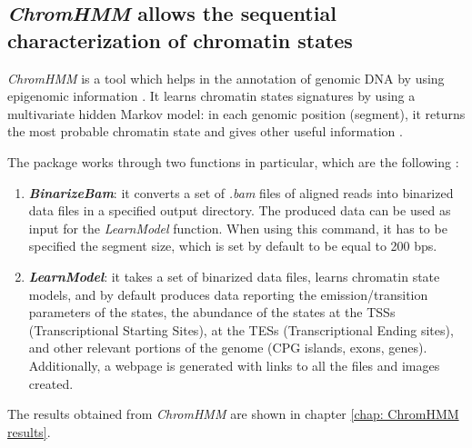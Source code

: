 \subsection{\textit{ChromHMM} allows the sequential characterization of chromatin states} \label{intro: chromhmm}
\textit{ChromHMM}
\cite{chilledhousevibesLearningChromatinStates2015}
is a tool which helps in the annotation of genomic DNA by using epigenomic information
\cite{ernstChromatinstateDiscoveryGenome2017}.
It learns chromatin states signatures by using a multivariate hidden Markov model: in each genomic position (segment), it returns the most probable chromatin state and gives other useful information
\cite{chilledhousevibesLearningChromatinStates2015,ernstChromatinstateDiscoveryGenome2017}. 

The package works through two functions in particular, which are the following
\cite{ernstChromatinstateDiscoveryGenome2017}:
\begin{enumerate}
    \item \textbf{\textit{BinarizeBam}}: it converts a set of \textit{.bam} files of aligned reads into binarized data files in a specified output directory. The produced data can be used as input for the \textit{LearnModel} function. When using this command, it has to be specified the segment size, which is set by default to be equal to 200 bps.
    \item  \textbf{\textit{LearnModel}}: it takes a set of binarized data files, learns chromatin state models, and by default produces data reporting the emission/transition parameters of the states, the abundance of the states at the TSSs (Transcriptional Starting Sites), at the TESs (Transcriptional Ending sites), and other relevant portions of the genome (CPG islands, exons, genes). Additionally, a webpage is generated with links to all the files and images created.
\end{enumerate}

\noindent The results obtained from \textit{ChromHMM} are shown in chapter \ref{chap: ChromHMM results}.
